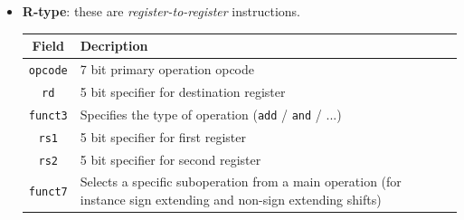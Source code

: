\documentclass[a4paper,11pt]{article}
\begin{document}
\begin{itemize}
	\item \textbf{R-type}: these are \textit{register-to-register} instructions.
	      \begin{table}[H]
		      \center
		      \begin{tabular} { c | p{12cm} }
			      \bfseries Field & \bfseries Decription                                                                                              \\
			      \hline
			      \texttt{opcode} & 7 bit primary operation opcode                                                                                    \\
			      \texttt{rd}     & 5 bit specifier for destination register                                                                          \\
			      \texttt{funct3} & Specifies the type of operation (\lstinline|add| / \lstinline|and| / ...)                                         \\
			      \texttt{rs1}    & 5 bit specifier for first register                                                                                \\
			      \texttt{rs2}    & 5 bit specifier for second register                                                                               \\
			      \texttt{funct7} & Selects a specific suboperation from a main operation (for instance sign extending and non-sign extending shifts) \\
		      \end{tabular}
	      \end{table}


\end{itemize}
\end{document}

